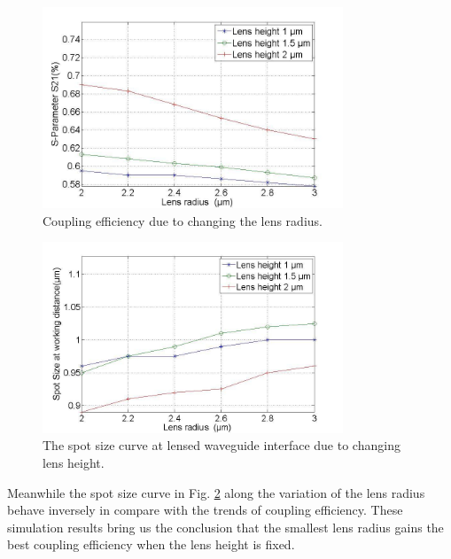 \begin{figure}[!ht]
\centering
\includegraphics[width=0.8\textwidth]{bilder/s21_fix_lens_height_rxx}
\caption{Coupling efficiency due to changing the lens radius.}
\label{fig:coupling_lenses_curve_rxx}
\end{figure}
\begin{figure}[!ht]
\centering
\includegraphics[width=0.8\textwidth]{bilder/spot_fix_lens_height_rxx}
\caption{The spot size curve at lensed waveguide interface due to changing lens height.}
\label{fig:lensed_guide_spot_size_curve_rxx}
\end{figure}
Meanwhile the spot size curve in Fig. \ref{fig:lensed_guide_spot_size_curve_rxx} along the variation of the lens radius behave inversely in compare with the trends of coupling efficiency. These simulation results bring us the conclusion that the smallest lens radius gains the best coupling efficiency when the lens height is fixed. 
